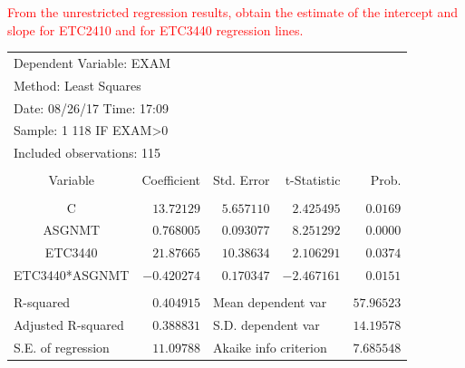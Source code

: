 \documentclass[12pt]{report}
\begin{document}
\newpage
\noindent \textcolor{red}
{
	From the unrestricted regression results, obtain the estimate of the intercept and slope for ETC2410 and for ETC3440 regression lines.
}
\begin{table}[H]
	\centering
	\begin{tabular}{lrrrr}
		\multicolumn{3}{l}{Dependent Variable: EXAM}&\multicolumn{1}{c}{}&\multicolumn{1}{c}{}\\
		\multicolumn{3}{l}{Method: Least Squares}&\multicolumn{1}{c}{}&\multicolumn{1}{c}{}\\
		\multicolumn{3}{l}{Date: 08/26/17   Time: 17:09}&\multicolumn{1}{c}{}&\multicolumn{1}{c}{}\\
		\multicolumn{3}{l}{Sample: 1 118 IF EXAM\textgreater 0}&\multicolumn{1}{c}{}&\multicolumn{1}{c}{}\\
		\multicolumn{3}{l}{Included observations: 115}&\multicolumn{1}{c}{}&\multicolumn{1}{c}{}\\
		[4.5pt] \hline \\ [-4.5pt]
		\multicolumn{1}{c}{Variable}&\multicolumn{1}{r}{Coefficient}&\multicolumn{1}{r}{Std. Error}&\multicolumn{1}{r}{t-Statistic}&\multicolumn{1}{r}{Prob.}\\
		[4.5pt] \hline \\ [-4.5pt]
		\multicolumn{1}{c}{C}&\multicolumn{1}{r}{$13.72129$}&\multicolumn{1}{r}{$5.657110$}&\multicolumn{1}{r}{$2.425495$}&\multicolumn{1}{r}{$0.0169$}\\
		\multicolumn{1}{c}{ASGNMT}&\multicolumn{1}{r}{$0.768005$}&\multicolumn{1}{r}{$0.093077$}&\multicolumn{1}{r}{$8.251292$}&\multicolumn{1}{r}{$0.0000$}\\
		\multicolumn{1}{c}{ETC3440}&\multicolumn{1}{r}{$21.87665$}&\multicolumn{1}{r}{$10.38634$}&\multicolumn{1}{r}{$2.106291$}&\multicolumn{1}{r}{$0.0374$}\\
		\multicolumn{1}{c}{ETC3440*ASGNMT}&\multicolumn{1}{r}{$-0.420274$}&\multicolumn{1}{r}{$0.170347$}&\multicolumn{1}{r}{$-2.467161$}&\multicolumn{1}{r}{$0.0151$}\\
		[4.5pt] \hline \\ [-4.5pt]
		\multicolumn{1}{l}{R-squared}&\multicolumn{1}{r}{$0.404915$}&\multicolumn{2}{l}{Mean dependent var}&\multicolumn{1}{r}{$57.96523$}\\
		\multicolumn{1}{l}{Adjusted R-squared}&\multicolumn{1}{r}{$0.388831$}&\multicolumn{2}{l}{S.D. dependent var}&\multicolumn{1}{r}{$14.19578$}\\
		\multicolumn{1}{l}{S.E. of regression}&\multicolumn{1}{r}{$11.09788$}&\multicolumn{2}{l}{Akaike info criterion}&\multicolumn{1}{r}{$7.685548$}\\

\end{tabular}
\end{table}
\end{document}
